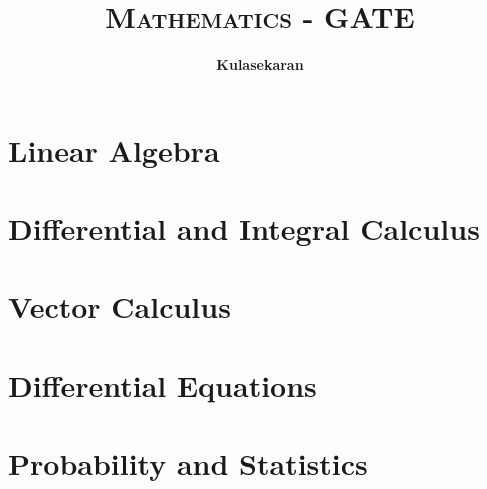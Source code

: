 \documentclass[8pt]{report}
\title{\Huge{\textsc{Mathematics - GATE}}}
\author{\huge{\textbf{Kulasekaran}}}
\begin{document}
\maketitle
\tableofcontents
\chapter{Linear Algebra}
\chapter{Differential and Integral Calculus}
\chapter{Vector Calculus}
\chapter{Differential Equations}
\chapter{Probability and Statistics}
\end{document}
